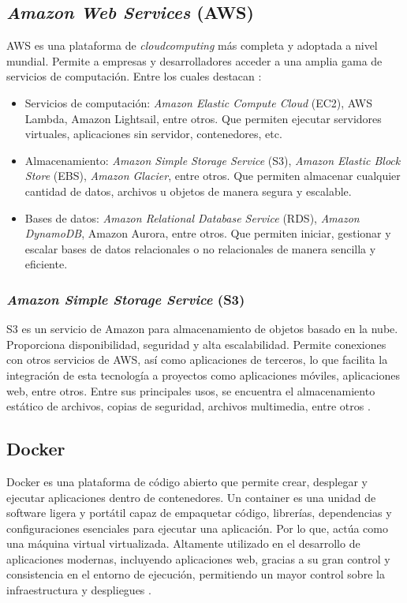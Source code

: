 \subsection{\textit{Amazon Web Services} (AWS)}
AWS es una plataforma de \textit{\gls{cloudcomputing}} más completa y adoptada a nivel mundial. Permite a empresas y desarrolladores
acceder a una amplia gama de servicios de computación. Entre los cuales destacan \cite{aws2026aws}:
\begin{itemize}
    \item Servicios de computación: \textit{Amazon Elastic Compute Cloud} (EC2), AWS Lambda, Amazon Lightsail, entre otros. Que permiten
            ejecutar servidores virtuales, aplicaciones sin servidor, contenedores, etc.
    \item Almacenamiento: \textit{Amazon Simple Storage Service} (S3), \textit{Amazon Elastic Block Store} (EBS), \textit{Amazon Glacier},
            entre otros. Que permiten almacenar cualquier cantidad de datos, archivos u objetos de manera segura y escalable.
    \item Bases de datos: \textit{Amazon Relational Database Service} (RDS), \textit{Amazon DynamoDB}, Amazon Aurora, entre otros. Que permiten
            iniciar, gestionar y escalar bases de datos relacionales o no relacionales de manera sencilla y eficiente.
\end{itemize}

\subsubsection{\textit{Amazon Simple Storage Service} (S3)}
S3 es un servicio de Amazon para almacenamiento de objetos basado en la nube. Proporciona disponibilidad, seguridad y alta escalabilidad.
Permite conexiones con otros servicios de AWS, así como aplicaciones de terceros, lo que facilita la integración de esta tecnología a proyectos
como aplicaciones móviles, aplicaciones web, entre otros. Entre sus principales usos, se encuentra el almacenamiento estático de archivos, 
copias de seguridad, archivos multimedia, entre otros \cite{aws2024s3}.

\subsection{Docker}
Docker es una plataforma de código abierto que permite crear, desplegar y ejecutar aplicaciones dentro de contenedores. Un
\gls{container} es una unidad de software ligera y portátil capaz de empaquetar código, librerías, dependencias y configuraciones
esenciales para ejecutar una aplicación. Por lo que, actúa como una máquina virtual virtualizada. Altamente utilizado en el 
desarrollo de aplicaciones modernas, incluyendo aplicaciones web, gracias a su gran control y consistencia en el entorno de 
ejecución, permitiendo un mayor control sobre la infraestructura y despliegues \cite{aws2025docker}.

